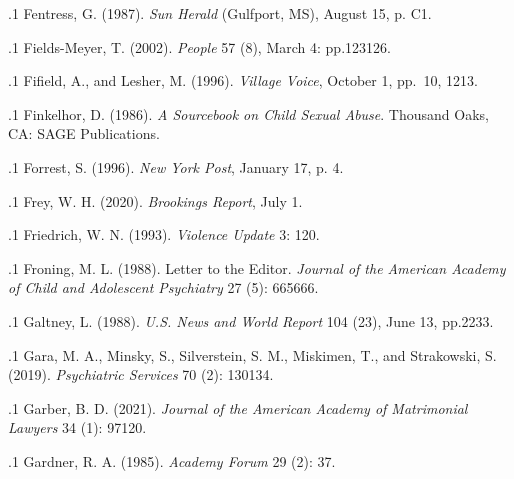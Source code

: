 \documentclass[11pt, twoside]{article}
\begin{document}
{\p.1{%
Fentress, G. (1987).  \textit{Sun Herald}
(Gulfport, MS), August 15, p. C1.
}%

\p.1{%
Fields-Meyer, T. (2002).  \textit{People} 57 (8),
March 4: pp.\@ 123\ndash{}126.
}%

\p.1{%
Fifield, A., and Lesher, M. (1996).  \textit{Village Voice}, October 1, pp.~10, 12\ndash{}13.
}%

\p.1{%
Finkelhor, D. (1986). \textit{A Sourcebook on Child Sexual Abuse}. Thousand Oaks, CA: SAGE
Publications.
}%

\p.1{%
Forrest, S. (1996).  \textit{New York Post},
January 17, p. 4.
}%

\p.1{%
Frey, W. H. (2020).  \textit{Brookings Report}, July 1.
}%

\p.1{%
Friedrich, W. N. (1993).  \textit{Violence
Update} 3: 1\ndash{}20.
}%

\p.1{%
Froning, M. L. (1988). Letter to the Editor. \textit{Journal of the American Academy of Child
and Adolescent Psychiatry} 27 (5): 665\ndash{}666.
}%

\p.1{%
Galtney, L. (1988).  \textit{U.S. News and World Report} 104 (23),
June 13, pp.\@ 22\ndash{}33.
}%

\p.1{%
Gara, M. A., Minsky, S., Silverstein, S. M., Miskimen, T., and Strakowski, S. (2019).  \textit{Psychiatric Services} 70 (2): 130\ndash{}134.
}%

\p.1{%
Garber, B. D. (2021).  \textit{Journal of the American Academy of Matrimonial
Lawyers} 34 (1): 97\ndash{}120.
}%

\p.1{%
Gardner, R. A. (1985).  \textit{Academy
Forum} 29 (2): 3\ndash{}7.
}%

}
\end{document}
